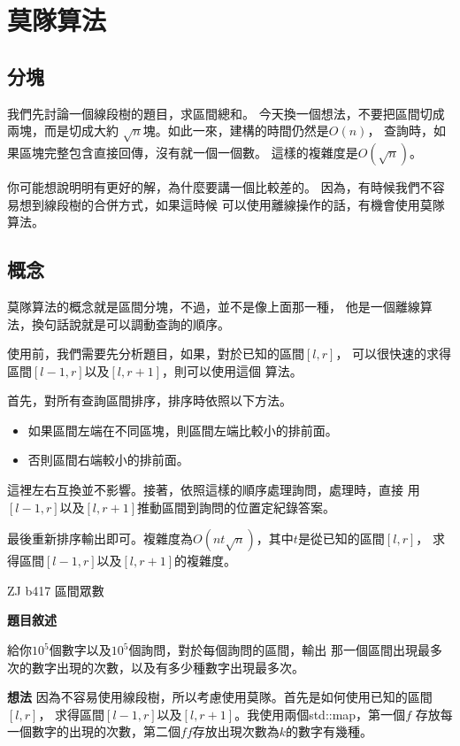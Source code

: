 \section{莫隊算法}
    \subsection{分塊}
    我們先討論一個線段樹的題目，求區間總和。
    今天換一個想法，不要把區間切成兩塊，而是切成大約
    $\sqrt{n}$塊。如此一來，建構的時間仍然是$O(n)$，
    查詢時，如果區塊完整包含直接回傳，沒有就一個一個數。
    這樣的複雜度是$O(\sqrt{n})$。

    你可能想說明明有更好的解，為什麼要講一個比較差的。
    因為，有時候我們不容易想到線段樹的合併方式，如果這時候
    可以使用離線操作的話，有機會使用莫隊算法。

    \subsection{概念}
    莫隊算法的概念就是區間分塊，不過，並不是像上面那一種，
    他是一個離線算法，換句話說就是可以調動查詢的順序。

    使用前，我們需要先分析題目，如果，對於已知的區間$[l,r]$，
    可以很快速的求得區間$[l-1,r]$以及$[l,r+1]$，則可以使用這個
    算法。

    首先，對所有查詢區間排序，排序時依照以下方法。

    \begin{itemize}
        \item 如果區間左端在不同區塊，則區間左端比較小的排前面。
        \item 否則區間右端較小的排前面。
    \end{itemize}

    這裡左右互換並不影響。接著，依照這樣的順序處理詢問，處理時，直接
    用$[l-1,r]$以及$[l,r+1]$推動區間到詢問的位置定紀錄答案。

    最後重新排序輸出即可。複雜度為$O(nt \sqrt{n})$，其中$t$是從已知的區間$[l,r]$，
    求得區間$[l-1,r]$以及$[l,r+1]$的複雜度。

    \example ZJ b417 區間眾數

    \textbf{題目敘述}

    給你$10^5$個數字以及$10^5$個詢問，對於每個詢問的區間，輸出
    那一個區間出現最多次的數字出現的次數，以及有多少種數字出現最多次。

    \textbf{想法}
    因為不容易使用線段樹，所以考慮使用莫隊。首先是如何使用已知的區間$[l,r]$，
    求得區間$[l-1,r]$以及$[l,r+1]$。我使用兩個std::map，第一個$f$
    存放每一個數字的出現的次數，第二個$ff$存放出現次數為$k$的數字有幾種。

